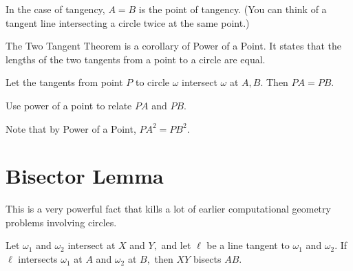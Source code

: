 In the case of tangency, $A=B$ is the point of tangency. (You can think of a tangent line intersecting a circle twice at the same point.)

The Two Tangent Theorem is a corollary of Power of a Point. It states that the lengths of the two tangents from a point to a circle are equal.

\begin{fact}
Let the tangents from point $P$ to circle $\omega$ intersect $\omega$ at $A,B.$ Then $PA=PB.$
\begin{hint}
\begin{addhint}
{Use power of a point to relate $PA$ and $PB.$}
\end{addhint}
\end{hint}
\begin{solu}
\begin{addsol}
{Note that by Power of a Point, $PA^2=PB^2.$

}
\end{addsol}
\end{solu}
\end{fact}

\section{Bisector Lemma}

This is a very powerful fact that kills a lot of earlier computational geometry problems involving circles.

\begin{fact}
Let $\omega_1$ and $\omega_2$ intersect at $X$ and $Y,$ and let $\ell$ be a line tangent to $\omega_1$ and $\omega_2.$ If $\ell$ intersects $\omega_1$ at $A$ and $\omega_2$ at $B,$ then $XY$ bisects $AB.$
\end{fact}

